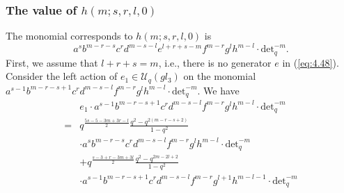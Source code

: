 \documentclass[table,a4paper,reqno]{amsart}
\numberwithin{equation}{section}
\theoremstyle{definition}
\begin{document}
\subsubsection{The value of $h(m;s,r,l,0)$}
The monomial corresponds to $h(m;s,r,l,0)$ is
\begin{equation}\label{eq:4.48}
    a^sb^{m-r-s}c^{r}d^{m-s-l}e^{l+r+s-m}f^{m-r}g^{l}h^{m-l}\cdot\text{det}_q^{-m}.
\end{equation}
First, we assume that $l+r+s=m$, i.e., there is no generator $e$ in (\ref{eq:4.48}). Consider the left action of $e_1\in\mathcal{U}_q(gl_3)$ on the monomial $a^{s-1}b^{m-r-s+1}c^{r}d^{m-s-l}f^{m-r}g^{l}h^{m-l}\cdot\text{det}_q^{-m}$. We have
\begin{equation}\label{eq:4.49}
    \begin{split}
        &e_1\cdot a^{s-1}b^{m-r-s+1}c^{r}d^{m-s-l}f^{m-r}g^{l}h^{m-l}\cdot\text{det}_q^{-m}\\
        =&q^{\frac{5s-5-3m+3r-l}{2}}\frac{q^2-q^{2(m-r-s+2)}}{1-q^2}\\
        &\cdot a^{s}b^{m-r-s}c^{r}d^{m-s-l}f^{m-r}g^{l}h^{m-l}\cdot\text{det}_q^{-m}\\
        &+q^{\frac{s-3+r-3m+3l}{2}}\frac{q^2-q^{2m-2l+2}}{1-q^2}\\
        &\cdot a^{s-1}b^{m-r-s+1}c^{r}d^{m-s-l}f^{m-r}g^{l+1}h^{m-l-1}\cdot\text{det}_q^{-m}\\
    \end{split}
\end{equation}
\end{document}
